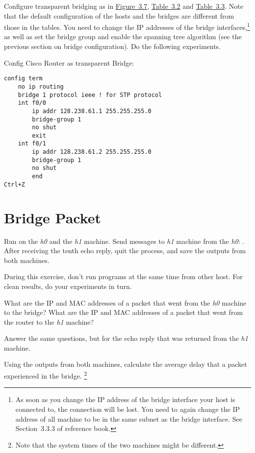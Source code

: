 \documentclass{../UTNetLab}
\begin{document}
Configure transparent bridging as in \hyperref[fig:3.7]{Figure~3.7}, \hyperref[tab:3.2]{Table~3.2} and \hyperref[tab:3.3]{Table~3.3}.
Note that the default configuration of the hosts and the bridges are different from those in the tables.
You need to change the IP addresses of the bridge interfaces,\footnote{As soon as you change the IP address of the bridge interface your host is connected to, the  connection will be lost.
    You need to again change the IP address of all machine to be in the same subnet as the bridge interface.
    See Section~3.3.3  of reference book.} as well as set the bridge group and enable the spanning tree algorithm (see the previous section on bridge configuration).
Do the following experiments.

Config Cisco Router as transparent Bridge:
\begin{lstlisting}[language={cisco}]
config term
    no ip routing
    bridge 1 protocol ieee ! for STP protocol
    int f0/0
        ip addr 128.238.61.1 255.255.255.0
        bridge-group 1
        no shut
        exit
    int f0/1
        ip addr 128.238.61.2 255.255.255.0
        bridge-group 1
        no shut
        end
Ctrl+Z
    \end{lstlisting}

\section{Bridge Packet}
Run  on the \textit{h0} and the \textit{h1} machine.
Send  messages to \textit{h1} machine from the \textit{h0}: .
After receiving the tenth echo reply, quit the  process, and save the  outputs from both machines.

During this exercise, don’t run  programs at the same time from other host.
For clean results, do your experiments in turn.

\begin{report}
    \item What are the IP and MAC addresses of a packet that went from the \textit{h0} machine to the bridge?
    What are the IP and MAC addresses of a packet that went from the router to the \textit{h1} machine?

    \item Answer the same questions, but for the echo reply that was returned from the \textit{h1} machine.

    \item Using the  outputs from both machines, calculate the average delay that a packet experienced in the bridge.
    \footnote{Note that the system times of the two machines might be different.}
\end{report}
\end{document}
